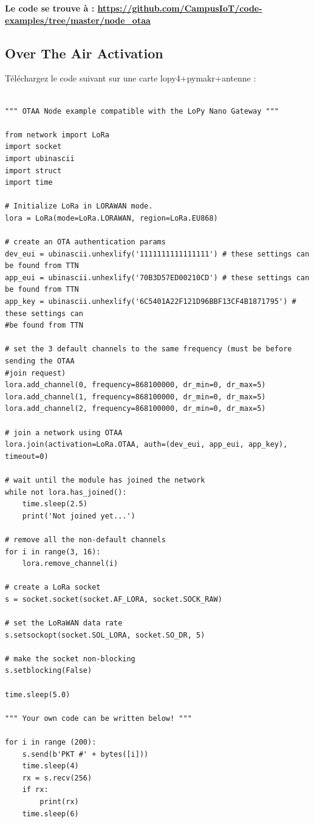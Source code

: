 \documentclass{article}
\begin{document}
\textbf{Le code se trouve à : \url{https://github.com/CampusIoT/code-examples/tree/master/node_otaa}}

\subsection{Over The Air Activation}
Téléchargez le code suivant sur une carte lopy4+pymakr+antenne :

\begin{verbatim}

""" OTAA Node example compatible with the LoPy Nano Gateway """

from network import LoRa
import socket
import ubinascii
import struct
import time

# Initialize LoRa in LORAWAN mode.
lora = LoRa(mode=LoRa.LORAWAN, region=LoRa.EU868)

# create an OTA authentication params
dev_eui = ubinascii.unhexlify('1111111111111111') # these settings can be found from TTN
app_eui = ubinascii.unhexlify('70B3D57ED00210CD') # these settings can be found from TTN
app_key = ubinascii.unhexlify('6C5401A22F121D96BBF13CF4B1871795') # these settings can 
#be found from TTN

# set the 3 default channels to the same frequency (must be before sending the OTAA 
#join request)
lora.add_channel(0, frequency=868100000, dr_min=0, dr_max=5)
lora.add_channel(1, frequency=868100000, dr_min=0, dr_max=5)
lora.add_channel(2, frequency=868100000, dr_min=0, dr_max=5)

# join a network using OTAA
lora.join(activation=LoRa.OTAA, auth=(dev_eui, app_eui, app_key), timeout=0)

# wait until the module has joined the network
while not lora.has_joined():
    time.sleep(2.5)
    print('Not joined yet...')

# remove all the non-default channels
for i in range(3, 16):
    lora.remove_channel(i)

# create a LoRa socket
s = socket.socket(socket.AF_LORA, socket.SOCK_RAW)

# set the LoRaWAN data rate
s.setsockopt(socket.SOL_LORA, socket.SO_DR, 5)

# make the socket non-blocking
s.setblocking(False)

time.sleep(5.0)

""" Your own code can be written below! """

for i in range (200):
    s.send(b'PKT #' + bytes([i]))
    time.sleep(4)
    rx = s.recv(256)
    if rx:
        print(rx)
    time.sleep(6)


\end{verbatim}
\end{document}
